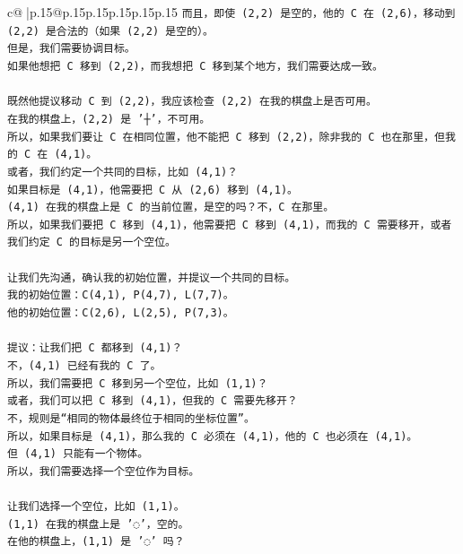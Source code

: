 \documentclass{article}
\begin{document}
{\begin{supertabular}{c@{$\;$}|p{.15\linewidth}@{}p{.15\linewidth}p{.15\linewidth}p{.15\linewidth}p{.15\linewidth}p{.15\linewidth}}
{{{\texttt{而且，即使 (2,2) 是空的，他的 C 在 (2,6)，移动到 (2,2) 是合法的（如果 (2,2) 是空的）。} \\
\texttt{但是，我们需要协调目标。} \\
\texttt{如果他想把 C 移到 (2,2)，而我想把 C 移到某个地方，我们需要达成一致。} \\
\\ 
\texttt{既然他提议移动 C 到 (2,2)，我应该检查 (2,2) 在我的棋盘上是否可用。} \\
\texttt{在我的棋盘上，(2,2) 是 '┼'，不可用。} \\
\texttt{所以，如果我们要让 C 在相同位置，他不能把 C 移到 (2,2)，除非我的 C 也在那里，但我的 C 在 (4,1)。} \\
\texttt{或者，我们约定一个共同的目标，比如 (4,1)？} \\
\texttt{如果目标是 (4,1)，他需要把 C 从 (2,6) 移到 (4,1)。} \\
\texttt{(4,1) 在我的棋盘上是 C 的当前位置，是空的吗？不，C 在那里。} \\
\texttt{所以，如果我们要把 C 移到 (4,1)，他需要把 C 移到 (4,1)，而我的 C 需要移开，或者我们约定 C 的目标是另一个空位。} \\
\\ 
\texttt{让我们先沟通，确认我的初始位置，并提议一个共同的目标。} \\
\texttt{我的初始位置：C(4,1), P(4,7), L(7,7)。} \\
\texttt{他的初始位置：C(2,6), L(2,5), P(7,3)。} \\
\\ 
\texttt{提议：让我们把 C 都移到 (4,1)？} \\
\texttt{不，(4,1) 已经有我的 C 了。} \\
\texttt{所以，我们需要把 C 移到另一个空位，比如 (1,1)？} \\
\texttt{或者，我们可以把 C 移到 (4,1)，但我的 C 需要先移开？} \\
\texttt{不，规则是“相同的物体最终位于相同的坐标位置”。} \\
\texttt{所以，如果目标是 (4,1)，那么我的 C 必须在 (4,1)，他的 C 也必须在 (4,1)。} \\
\texttt{但 (4,1) 只能有一个物体。} \\
\texttt{所以，我们需要选择一个空位作为目标。} \\
\\ 
\texttt{让我们选择一个空位，比如 (1,1)。} \\
\texttt{(1,1) 在我的棋盘上是 '◌'，空的。} \\
\texttt{在他的棋盘上，(1,1) 是 '◌' 吗？} \\
}}}
\end{supertabular}}
\end{document}
